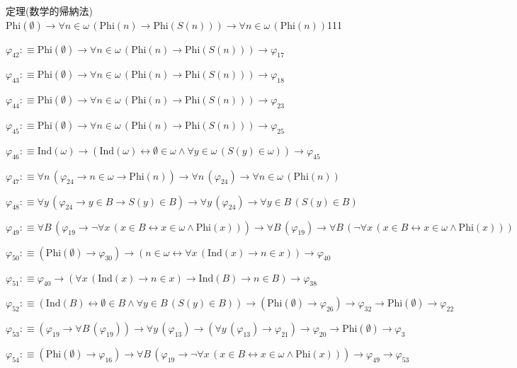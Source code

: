 \begin{fullproof}{定理(数学的帰納法)}{$\mathrm{Phi}(\emptyset) \to \forall n \in \omega\,(\mathrm{Phi}(n) \to \mathrm{Phi}(S(n))) \to \forall n \in \omega\,(\mathrm{Phi}(n))$}{111}
\begin{abbrevlist}
\item $\varphi_{42} :\equiv \mathrm{Phi}(\emptyset) \to \forall n \in \omega\,(\mathrm{Phi}(n) \to \mathrm{Phi}(S(n))) \to \varphi_{17}$
\item $\varphi_{43} :\equiv \mathrm{Phi}(\emptyset) \to \forall n \in \omega\,(\mathrm{Phi}(n) \to \mathrm{Phi}(S(n))) \to \varphi_{18}$
\item $\varphi_{44} :\equiv \mathrm{Phi}(\emptyset) \to \forall n \in \omega\,(\mathrm{Phi}(n) \to \mathrm{Phi}(S(n))) \to \varphi_{23}$
\item $\varphi_{45} :\equiv \mathrm{Phi}(\emptyset) \to \forall n \in \omega\,(\mathrm{Phi}(n) \to \mathrm{Phi}(S(n))) \to \varphi_{25}$
\item $\varphi_{46} :\equiv \mathrm{Ind}(\omega) \to (\mathrm{Ind}(\omega) \leftrightarrow \emptyset \in \omega \land \forall y \in \omega\,(S(y) \in \omega)) \to \varphi_{45}$
\item $\varphi_{47} :\equiv \forall n\,(\varphi_{24} \to n \in \omega \to \mathrm{Phi}(n)) \to \forall n\,(\varphi_{24}) \to \forall n \in \omega\,(\mathrm{Phi}(n))$
\item $\varphi_{48} :\equiv \forall y\,(\varphi_{24} \to y \in B \to S(y) \in B) \to \forall y\,(\varphi_{24}) \to \forall y \in B\,(S(y) \in B)$
\item $\varphi_{49} :\equiv \forall B\,(\varphi_{19} \to \neg \forall x\,(x \in B \leftrightarrow x \in \omega \land \mathrm{Phi}(x))) \to \forall B\,(\varphi_{19}) \to \forall B\,(\neg \forall x\,(x \in B \leftrightarrow x \in \omega \land \mathrm{Phi}(x)))$
\item $\varphi_{50} :\equiv (\mathrm{Phi}(\emptyset) \to \varphi_{30}) \to (n \in \omega \leftrightarrow \forall x\,(\mathrm{Ind}(x) \to n \in x)) \to \varphi_{40}$
\item $\varphi_{51} :\equiv \varphi_{40} \to (\forall x\,(\mathrm{Ind}(x) \to n \in x) \to \mathrm{Ind}(B) \to n \in B) \to \varphi_{38}$
\item $\varphi_{52} :\equiv (\mathrm{Ind}(B) \leftrightarrow \emptyset \in B \land \forall y \in B\,(S(y) \in B)) \to (\mathrm{Phi}(\emptyset) \to \varphi_{26}) \to \varphi_{32} \to \mathrm{Phi}(\emptyset) \to \varphi_{22}$
\item $\varphi_{53} :\equiv (\varphi_{19} \to \forall B\,(\varphi_{19})) \to \forall y\,(\varphi_{13}) \to (\forall y\,(\varphi_{13}) \to \varphi_{21}) \to \varphi_{20} \to \mathrm{Phi}(\emptyset) \to \varphi_{3}$
\item $\varphi_{54} :\equiv (\mathrm{Phi}(\emptyset) \to \varphi_{16}) \to \forall B\,(\varphi_{19} \to \neg \forall x\,(x \in B \leftrightarrow x \in \omega \land \mathrm{Phi}(x))) \to \varphi_{49} \to \varphi_{53}$
\end{abbrevlist}
\end{fullproof}
